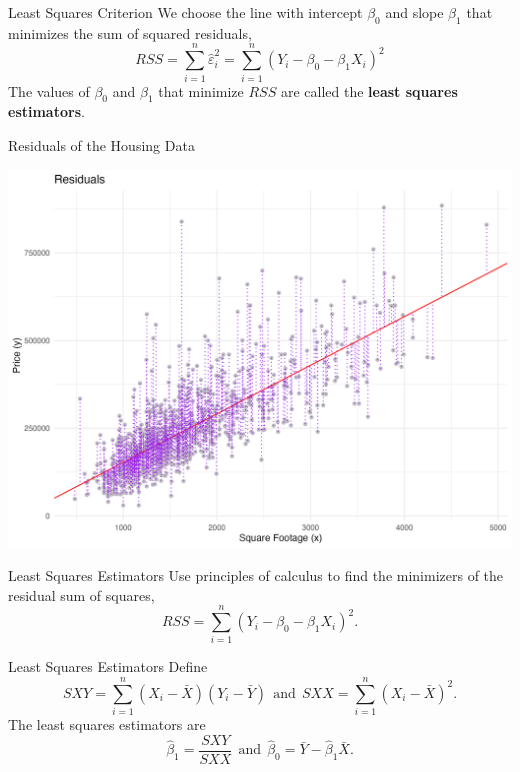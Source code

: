 \documentclass{beamer}
\begin{document}
\begin{frame}{Least Squares Criterion}
    We choose the line with intercept $\beta_0$ and slope $\beta_1$ that minimizes the sum of squared residuals, 
    \begin{equation*}
        RSS = \sum_{i=1}^n \hat{\varepsilon}_i^2 = \sum_{i=1}^n (Y_i - \beta_0 - \beta_1 X_i)^2
    \end{equation*}
    The values of $\beta_0$ and $\beta_1$ that minimize $RSS$ are called the \textbf{least squares estimators}.
\end{frame}

\begin{frame}{Residuals of the Housing Data}
    \begin{center}
        \includegraphics[width=.9\linewidth]{figures/housing_resid.png}
    \end{center}
\end{frame}

\begin{frame}[t]{Least Squares Estimators}
    Use principles of calculus to find the minimizers of the residual sum of squares,
    \begin{equation*}
        RSS = \sum_{i=1}^n (Y_i - \beta_0 - \beta_1 X_i)^2.
    \end{equation*}
\end{frame}

\begin{frame}{Least Squares Estimators}
    Define 
    \begin{equation*}
        SXY = \sum_{i=1}^n (X_i - \bar{X})(Y_i - \bar{Y})\ \ \textrm{and}\ \ SXX = \sum_{i=1}^n (X_i - \bar{X})^2.
    \end{equation*}
    The least squares estimators are 
    \begin{equation*}
        \hat{\beta}_1 = \frac{SXY}{SXX}\ \ \textrm{and}\ \ \hat{\beta}_0 = \bar{Y} - \hat{\beta}_1 \bar{X}.
    \end{equation*}
\end{frame}
\end{document}
